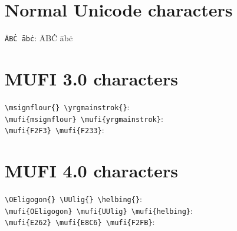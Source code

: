 \documentclass{article}
\begin{document}
\section{Normal Unicode characters}
\verb|ĀBĊ ābċ|: ĀBĊ ābċ


\section{MUFI 3.0 characters}
\verb|\msignflour{} \yrgmainstrok{}|: \msignflour{} \yrgmainstrok{}\\
\verb|\mufi{msignflour} \mufi{yrgmainstrok}|:  \\
\verb|\mufi{F2F3} \mufi{F233}|:  


\section{MUFI 4.0 characters}
\verb|\OEligogon{} \UUlig{} \helbing{}|: \OEligogon{} \UUlig{} \helbing{}\\
\verb|\mufi{OEligogon} \mufi{UUlig} \mufi{helbing}|:   \\
\verb|\mufi{E262} \mufi{E8C6} \mufi{F2FB}|:   
\end{document}
